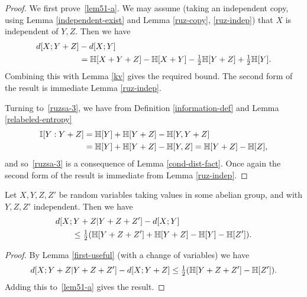   \begin{proof}
  We first prove~\eqref{lem51-a}. We may assume (taking an independent copy, using Lemma \ref{independent-exist} and Lemma \ref{ruz-copy}, \ref{ruz-indep}) that $X$ is independent of $Y, Z$. Then we have
  \begin{align*}  d[X;Y+Z] & - d[X;Y] \\ & = \mathbb{H}[X + Y + Z] - \mathbb{H}[X+Y] - \tfrac{1}{2}\mathbb{H}[Y + Z] + \tfrac{1}{2} \mathbb{H}[Y].\end{align*}
  Combining this with Lemma \ref{kv} gives the required bound. The second form of the result is immediate Lemma \ref{ruz-indep}.

  Turning to~\eqref{ruzsa-3}, we have from Definition \ref{information-def} and Lemma \ref{relabeled-entropy}
  \begin{align*}  \mathbb{I}[Y : Y+Z] & = \mathbb{H}[Y] + \mathbb{H}[Y + Z] - \mathbb{H}[Y, Y + Z] \\ & = \mathbb{H}[Y] + \mathbb{H}[Y + Z] - \mathbb{H}[Y, Z]  = \mathbb{H}[Y + Z] - \mathbb{H}[Z],\end{align*}
  and so~\eqref{ruzsa-3} is a consequence of Lemma \ref{cond-dist-fact}. Once again the second form of the result is immediate from Lemma \ref{ruz-indep}.
\end{proof}

\begin{lemma}\label{second-useful}
  \leanok
  Let $X, Y, Z, Z'$ be random variables taking values in some abelian group, and with $Y, Z, Z'$ independent. Then we have
  \begin{align}\nonumber
  & d[X;Y + Z | Y + Z + Z'] - d[X;Y] \\ & \qquad \leq \tfrac{1}{2} ( \mathbb{H}[Y + Z + Z'] + \mathbb{H}[Y + Z] - \mathbb{H}[Y] - \mathbb{H}[Z']).\label{7111}
  \end{align}
  \end{lemma}

  \begin{proof}
  By Lemma \ref{first-useful} (with a change of variables) we have
  \[ d[X; Y + Z | Y + Z + Z'] - d[X; Y + Z] \leq \tfrac{1}{2}( \mathbb{H}[Y + Z + Z'] - \mathbb{H}[Z']).\]
  Adding this to~\eqref{lem51-a} gives the result.
  \end{proof}
